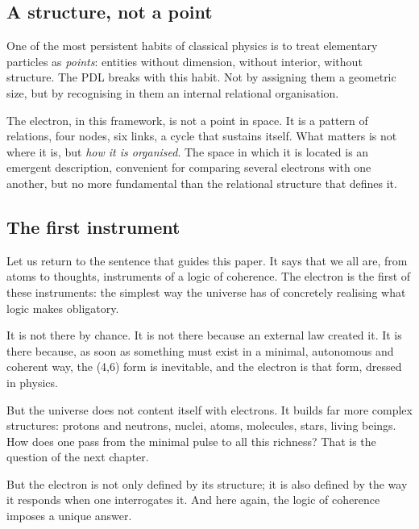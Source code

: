 \documentclass[11pt, a4paper, openright]{book}
\begin{document}
\subsection*{A structure, not a point}

One of the most persistent habits of classical physics is to treat elementary particles as \emph{points}: entities without dimension, without interior, without structure. The PDL breaks with this habit. Not by assigning them a geometric size, but by recognising in them an internal relational organisation.

\medskip

The electron, in this framework, is not a point in space. It is a pattern of relations, four nodes, six links, a cycle that sustains itself. What matters is not where it is, but \emph{how it is organised}. The space in which it is located is an emergent description, convenient for comparing several electrons with one another, but no more fundamental than the relational structure that defines it.

\subsection*{The first instrument}

Let us return to the sentence that guides this paper. It says that we all are, from atoms to thoughts, instruments of a logic of coherence. The electron is the first of these instruments: the simplest way the universe has of concretely realising what logic makes obligatory.

\medskip

It is not there by chance. It is not there because an external law created it. It is there because, as soon as something must exist in a minimal, autonomous and coherent way, the (4,6) form is inevitable, and the electron is that form, dressed in physics.

\medskip

But the universe does not content itself with electrons. It builds far more complex structures: protons and neutrons, nuclei, atoms, molecules, stars, living beings. How does one pass from the minimal pulse to all this richness? That is the question of the next chapter.

\medskip

But the electron is not only defined by its structure; it is also defined by the way it responds when one interrogates it. And here again, the logic of coherence imposes a unique answer.
\end{document}
